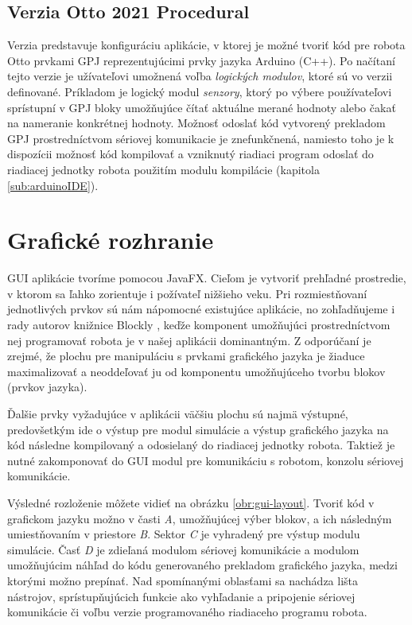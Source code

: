 \subsection{Verzia Otto 2021 Procedural}
Verzia  predstavuje konfiguráciu aplikácie, v ktorej je možné tvoriť kód pre robota Otto prvkami GPJ reprezentujúcimi prvky jazyka Arduino (C++). Po načítaní tejto verzie je užívateľovi umožnená voľba \textit{logických modulov}, ktoré sú vo verzii definované. Príkladom je logický modul \textit{senzory}, ktorý po výbere používateľovi sprístupní v GPJ bloky umožňujúce čítať aktuálne merané hodnoty alebo čakať na nameranie konkrétnej hodnoty. Možnosť odoslať kód vytvorený prekladom GPJ prostredníctvom sériovej komunikacie je znefunkčnená, namiesto toho je k dispozícii možnosť  kód kompilovať a vzniknutý riadiaci program odoslať do riadiacej jednotky robota použitím modulu kompilácie (kapitola \ref{sub:arduinoIDE}).

\newpage

\section{Grafické rozhranie}
GUI aplikácie tvoríme pomocou JavaFX. Cieľom je vytvoriť prehľadné prostredie, v ktorom sa ľahko zorientuje i požívateľ nižšieho veku. Pri rozmiestňovaní jednotlivých prvkov sú nám nápomocné existujúce aplikácie, no zohľadňujeme i rady autorov knižnice Blockly \cite{blocklyBestPractices}, keďže komponent umožňujúci prostredníctvom nej programovať robota je v našej aplikácii dominantným. Z odporúčaní je zrejmé, že plochu pre manipuláciu s prvkami grafického jazyka je žiaduce maximalizovať a neoddeľovať ju od komponentu umožňujúceho tvorbu blokov (prvkov jazyka).

Ďalšie prvky vyžadujúce v aplikácii väčšiu plochu sú najmä výstupné, predovšetkým ide o výstup pre modul simulácie a výstup  grafického jazyka na kód následne kompilovaný a odosielaný do riadiacej jednotky robota. Taktiež je nutné zakomponovať do GUI modul pre komunikáciu s robotom, konzolu sériovej komunikácie.

Výsledné rozloženie môžete vidieť na obrázku \ref{obr:gui-layout}. Tvoriť kód v grafickom jazyku možno v časti \textit{A}, umožňujúcej výber blokov, a ich následným umiestňovaním v priestore \textit{B}. Sektor \textit{C} je vyhradený pre výstup modulu simulácie. Časť \textit{D} je zdieľaná modulom sériovej komunikácie a modulom umožňujúcim náhľad do kódu generovaného prekladom grafického jazyka, medzi ktorými možno prepínať. Nad spomínanými oblasťami sa nachádza lišta nástrojov, sprístupňujúcich funkcie ako vyhľadanie a pripojenie sériovej komunikácie či voľbu verzie programovaného riadiaceho programu robota.

